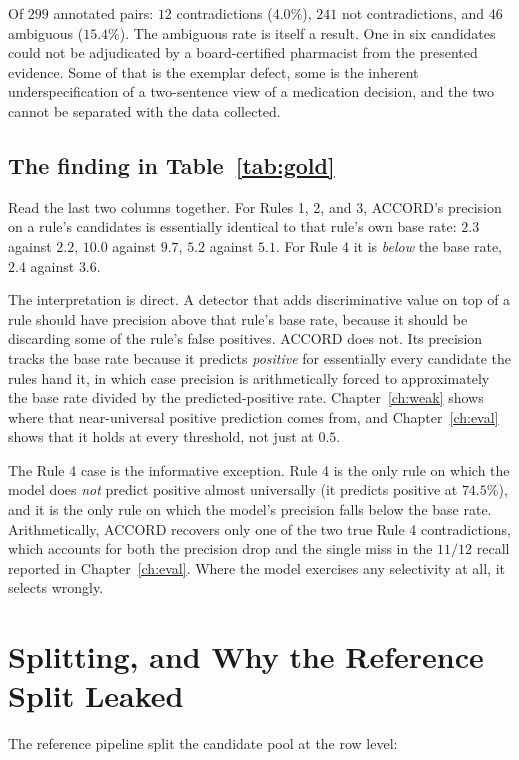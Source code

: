 Of $299$ annotated pairs: $12$ contradictions ($4.0\%$), $241$ not
contradictions, and $46$ ambiguous ($15.4\%$). The ambiguous rate is itself a
result. One in six candidates could not be adjudicated by a board-certified
pharmacist from the presented evidence. Some of that is the exemplar defect,
some is the inherent underspecification of a two-sentence view of a medication
decision, and the two cannot be separated with the data collected.

\subsection{The finding in Table~\ref{tab:gold}}

Read the last two columns together. For Rules 1, 2, and 3, ACCORD's precision on
a rule's candidates is essentially identical to that rule's own base rate:
$2.3$ against $2.2$, $10.0$ against $9.7$, $5.2$ against $5.1$. For Rule 4 it is
\emph{below} the base rate, $2.4$ against $3.6$.

The interpretation is direct. A detector that adds discriminative value on top
of a rule should have precision above that rule's base rate, because it should
be discarding some of the rule's false positives. ACCORD does not. Its precision
tracks the base rate because it predicts \emph{positive} for essentially every
candidate the rules hand it, in which case precision is arithmetically forced to
approximately the base rate divided by the predicted-positive rate.
Chapter~\ref{ch:weak} shows where that near-universal positive prediction comes
from, and Chapter~\ref{ch:eval} shows that it holds at every threshold, not just
at $0.5$.

The Rule 4 case is the informative exception. Rule 4 is the only rule on which
the model does \emph{not} predict positive almost universally (it predicts
positive at $74.5\%$), and it is the only rule on which the model's precision
falls below the base rate. Arithmetically, ACCORD recovers only one of the two
true Rule 4 contradictions, which accounts for both the precision drop and the
single miss in the $11/12$ recall reported in Chapter~\ref{ch:eval}. Where the
model exercises any selectivity at all, it selects wrongly.

\section{Splitting, and Why the Reference Split Leaked}
\label{sec:splits}

The reference pipeline split the candidate pool at the row level:

